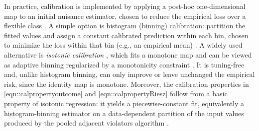 \documentclass[11pt]{article}
\theoremstyle{plain}
\begin{document}
In practice, calibration is implemented by applying a post-hoc one-dimensional map to an
initial nuisance estimator, chosen to reduce the empirical loss over a flexible class \citep{whitehouse2024orthogonal}.
A simple option is histogram (binning) calibration: partition the fitted values and assign a constant calibrated prediction within each bin, chosen to minimize the loss within that bin (e.g., an
empirical mean) \citep{zadrozny2001obtaining,gupta2021distribution,van2025generalized}.
A widely used alternative is \emph{isotonic calibration} \citep{zadrozny2002transforming,niculescu2005predicting},
which fits a monotone map and can be viewed as adaptive binning regularized by a
monotonicity constraint \citep{van2023causal,van2025generalized}. It is tuning-free and, unlike histogram binning, can only improve or leave unchanged the empirical risk, since the identity map is monotone. Moreover, the calibration properties in \eqref{eqn::calpropertyoutcome} and \eqref{eqn::calpropertyRiesz} follow from a basic property of isotonic regression: it yields a piecewise-constant fit, equivalently a histogram-binning estimator on a data-dependent partition of the input values produced by the pooled adjacent violators algorithm \citep{barlow1972isotonic}.
 

 
 


\end{document}
